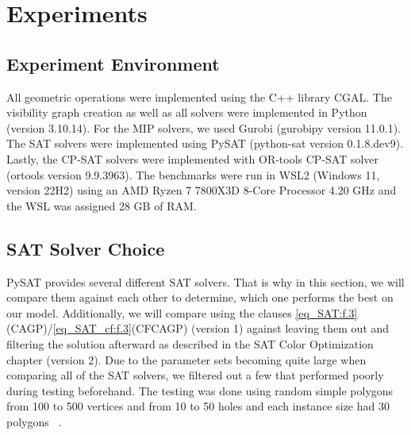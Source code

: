 \chapter{Experiments}
\section{Experiment Environment}
All geometric operations were implemented using the C++ library CGAL. The visibility graph creation as well as all solvers were implemented in Python (version 3.10.14). For the MIP solvers, we used Gurobi (gurobipy version 11.0.1). The SAT solvers were implemented using PySAT (python-sat version 0.1.8.dev9). Lastly, the CP-SAT solvers were implemented with OR-tools CP-SAT solver (ortools version 9.9.3963).
The benchmarks were run in WSL2 (Windows 11, version 22H2) using an AMD Ryzen 7 7800X3D 8-Core Processor 4.20 GHz and the WSL was assigned 28 GB of RAM.

\section{SAT Solver Choice}
PySAT provides several different SAT solvers. That is why in this section, we will compare them against each other to determine, which one performs the best on our model. Additionally, we will compare using the clauses \cref{eq_SAT:f.3}(CAGP)/\cref{eq_SAT_cf:f.3}(CFCAGP) (version 1) against leaving them out and filtering the solution afterward as described in the SAT Color Optimization chapter (version 2). Due to the parameter sets becoming quite large when comparing all of the SAT solvers, we filtered out a few that performed poorly during testing beforehand. The testing was done using random simple polygons from 100 to 500 vertices and from 10 to 50 holes and each instance size had 30 polygons ~\cite{art-gallery-unicamp-page}.

